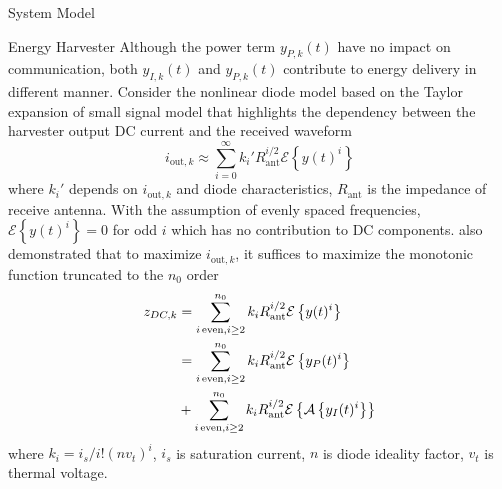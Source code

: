 \documentclass{IEEEtran}
\begin{document}
\begin{section} {System Model}
	\begin{subsection}	{Energy Harvester}
		Although the power term $y_{P,k}(t)$ have no impact on communication, both $y_{I,k}(t)$ and $y_{P,k}(t)$ contribute to energy delivery in different manner. Consider the nonlinear diode model based on the Taylor expansion of small signal model that highlights the dependency between the harvester output DC current and the received waveform \cite{Clerckx2018b,Clerckx2016a}
		\begin{equation}	\label{eq:i_k}
			i_{\text{out},k}\approx\sum_{i=0}^{\infty}{k_i'}{R_{\text{ant}}^{i/2}}{\mathcal{E}\left\{y(t)^i\right\}}
		\end{equation}
		where $k_i'$ depends on $i_{\text{out},k}$ and diode characteristics, $R_{\text{ant}}$ is the impedance of receive antenna. With the assumption of evenly spaced frequencies, $\mathcal{E}\left\{y(t)^i\right\}=0$ for odd $i$ which has no contribution to DC components. \cite{Clerckx2016a} also demonstrated that to maximize $i_{\text{out},k}$, it suffices to maximize the monotonic function truncated to the $n_0$ order
		\begin{equation}	\label{eq:z_{DC,k}}
			\begin{split}
				z_{DC,k}
				&=\sum_{i\,\text{even},i\ge2}^{n_0}{k_i}{R_{\text{ant}}^{i/2}}{\mathcal{E}\left\{y(t)^i\right\}}	\\
				&=\sum_{i\,\text{even},i\ge2}^{n_0}{k_i}{R_{\text{ant}}^{i/2}}{\mathcal{E}\left\{y_P(t)^i\right\}}	\\
				&+\sum_{i\,\text{even},i\ge2}^{n_0}{k_i}{R_{\text{ant}}^{i/2}}{\mathcal{E}\left\{\mathcal{A}\left\{y_I(t)^i\right\}\right\}}
			\end{split}
		\end{equation}
		where $k_i=i_s/i!(nv_t)^i$, $i_s$ is saturation current, $n$ is diode ideality factor, $v_t$ is thermal voltage.


	\end{subsection}
\end{section}



\end{document}
